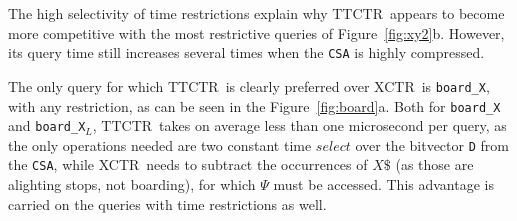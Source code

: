 \documentclass[runningheads]{llncs}
\newcommand{\ctr}{XCTR}
\newcommand{\ttctr}{TTCTR}
\begin{document}
The high selectivity of time restrictions explain why \ttctr~appears to become more competitive with the most restrictive queries of Figure~\ref{fig:xy2}b. However, its query time still increases several times when the \texttt{CSA} is highly compressed.

The only query for which \ttctr~is clearly preferred over \ctr~is \texttt{board\_X}, with any restriction, as can be seen in the Figure~\ref{fig:board}a. Both for \texttt{board\_X} and \texttt{board\_X$_{L}$}, \ttctr~takes on average less than one microsecond per query, as the only operations needed are two constant time $select$ over the bitvector \texttt{D} from the \texttt{CSA}, while \ctr~needs to subtract the occurrences of $X\$$ (as those are alighting stops, not boarding), for which $\Psi$ must be accessed. This advantage is carried on the queries with time restrictions as well.
\end{document}
